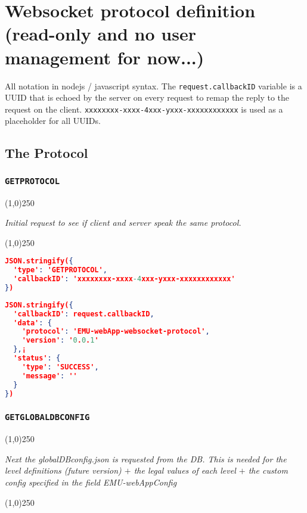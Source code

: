 \documentclass[A4,12pt, utf8]{article}
\begin{document}
\clearpage

\section{Websocket protocol definition (read-only and no user management for now...)}

All notation in nodejs / javascript syntax. The \texttt{request.callbackID} variable is a UUID that is echoed by the server on every request to remap the reply to the request on the client. \texttt{xxxxxxxx-xxxx-4xxx-yxxx-xxxxxxxxxxxx} is used as a placeholder for all UUIDs.


\subsection{The Protocol}

\subsubsection{\texttt{GETPROTOCOL}}
\begin{center}
  \line(1,0){250}

  \textit{Initial request to see if client and server speak the same protocol.}

  \line(1,0){250}
\end{center}


\begin{lstlisting}[caption=Request content, language=json]
JSON.stringify({
  'type': 'GETPROTOCOL', 
  'callbackID': 'xxxxxxxx-xxxx-4xxx-yxxx-xxxxxxxxxxxx'
})
\end{lstlisting}

\begin{lstlisting}[caption=Reply content, language=json]
JSON.stringify({
  'callbackID': request.callbackID,
  'data': {
    'protocol': 'EMU-webApp-websocket-protocol',
    'version': '0.0.1'
  },¡
  'status': {
    'type': 'SUCCESS',
    'message': ''
  }
})
\end{lstlisting}


\subsubsection{\texttt{GETGLOBALDBCONFIG}}
\begin{center}
  \line(1,0){250}

  \textit{Next the globalDBconfig.json is requested from the DB. This is needed for the level definitions (future version) $+$ the legal values of each level $+$ the custom config specified in the field EMU-webAppConfig}

  \line(1,0){250}
\end{center}
\end{document}
